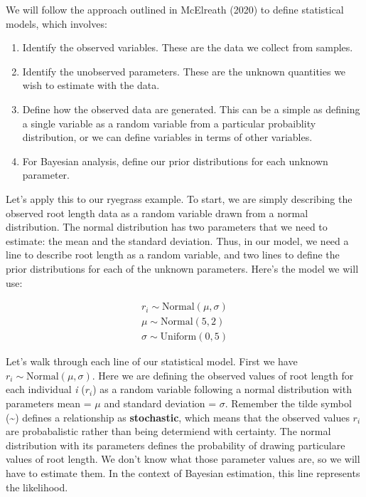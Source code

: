 \documentclass[
]{book}
\providecommand{\tightlist}{%
  \setlength{\itemsep}{0pt}\setlength{\parskip}{0pt}}
\begin{document}
We will follow the approach outlined in McElreath (2020) to define statistical models, which involves:

\begin{enumerate}
\def\labelenumi{\arabic{enumi}.}
\tightlist
\item
  Identify the observed variables. These are the data we collect from samples.
\item
  Identify the unobserved parameters. These are the unknown quantities we wish to estimate with the data.
\item
  Define how the observed data are generated. This can be a simple as defining a single variable as a random variable from a particular probaiblity distribution, or we can define variables in terms of other variables.
\item
  For Bayesian analysis, define our prior distributions for each unknown parameter.
\end{enumerate}

Let's apply this to our ryegrass example. To start, we are simply describing the observed root length data as a random variable drawn from a normal distribution. The normal distribution has two parameters that we need to estimate: the mean and the standard deviation. Thus, in our model, we need a line to describe root length as a random variable, and two lines to define the prior distributions for each of the unknown parameters. Here's the model we will use:

\[
\begin{array}{l}
r_i \sim \mathrm{Normal}(\mu, \sigma) \\
\mu \sim \mathrm{Normal}(5, 2) \\
\sigma \sim \mathrm{Uniform}(0, 5)
\end{array}
\]

Let's walk through each line of our statistical model. First we have \(r_i \sim \mathrm{Normal}(\mu, \sigma)\). Here we are defining the observed values of root length for each individual \emph{i} (\(r_i\)) as a random variable following a normal distribution with parameters mean = \(\mu\) and standard deviation = \(\sigma\). Remember the tilde symbol (\textasciitilde) defines a relationship as \textbf{stochastic}, which means that the observed values \(r_i\) are probabalistic rather than being determiend with certainty. The normal distribution with its parameters defines the probability of drawing particulare values of root length. We don't know what those parameter values are, so we will have to estimate them. In the context of Bayesian estimation, this line represents the likelihood.
\end{document}
